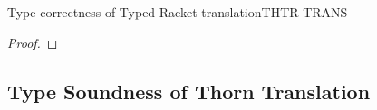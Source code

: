 \documentclass[acmlarge, anonymous, authordraft, review]{acmart} %
\begin{document}
\begin{lemma}{Type correctness of Typed Racket translation}{THTR-TRANS}
\begin{proof}
% 
% 
  \end{proof}
\end{lemma}

\subsection*{Type Soundness of Thorn Translation}
\end{document}
